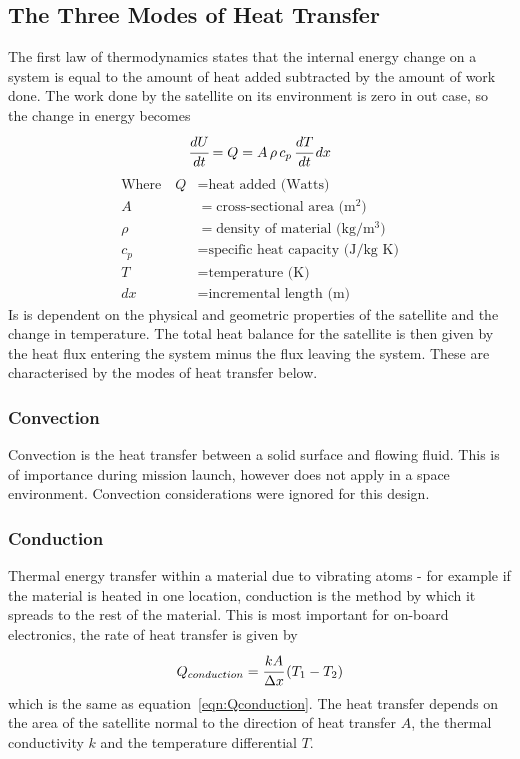 \subsection{The Three Modes of Heat Transfer}
The first law of thermodynamics states that the internal energy change on a system is equal to the amount of heat added subtracted by the amount of work done. The work done by the satellite on its environment is zero in out case, so the change in energy becomes
\[ \cfrac{dU}{dt} = Q = A\,\rho\,c_p\,\cfrac{dT}{dt}\,dx \]
\noindent
\begin{align}
\text{Where}\quad Q &= \text{heat added (Watts)} \nonumber\\
A &= \text{cross-sectional area (m$^2$)} \nonumber\\
\rho &= \text{density of material (kg/m$^3$)} \nonumber\\
c_p &= \text{specific heat capacity (J/kg K)} \nonumber\\
T &= \text{temperature (K)} \nonumber\\
dx &= \text{incremental length (m)} \nonumber
\end{align}
Is is dependent on the physical and geometric properties of the satellite and the change in temperature. The total heat balance for the satellite is then given by the heat flux entering the system minus the flux leaving the system. These are characterised by the modes of heat transfer below.
\subsubsection{Convection}
Convection is the heat transfer between a solid surface and flowing fluid. This is of importance during mission launch, however does not apply in a space environment. Convection considerations were ignored for this design.
\subsubsection{Conduction}
Thermal energy transfer within a material due to vibrating atoms - for example if the material is heated in one location, conduction is the method by which it spreads to the rest of the material. This is most important for on-board electronics, the rate of heat transfer is given by 
\[ Q_{conduction} = \cfrac{kA}{\Delta x}\,(T_1-T_2) \]
\noindent
which is the same as equation~\ref{eqn:Qconduction}. The heat transfer depends on the area of the satellite normal to the direction of heat transfer $A$, the thermal conductivity $k$ and the temperature differential $T$.
